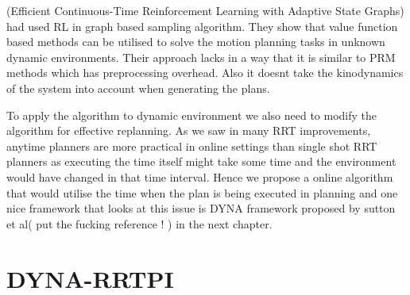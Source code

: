 \documentclass[MTech]{iitmdiss}
\begin{document}
(Efficient Continuous-Time Reinforcement Learning with Adaptive State Graphs) had used RL in graph based sampling algorithm. They show that value function based methods can be utilised to solve the motion planning tasks in unknown dynamic environments. Their approach lacks in a way that it is similar to PRM methods which has preprocessing overhead. Also it doesnt take the kinodynamics of the system into account when generating the plans.

To apply the algorithm to dynamic environment we also need to modify the algorithm for effective replanning. As we saw in many RRT improvements, anytime planners are more practical in online settings than single shot RRT planners as executing the time itself might take some time and the environment would have changed in that time interval. Hence we propose a online algorithm that would utilise the time when the plan is being executed in planning and one nice framework that looks at this issue is DYNA framework proposed by sutton et al( put the fucking reference ! ) in the next chapter.

\section{DYNA-RRTPI}
\end{document}
